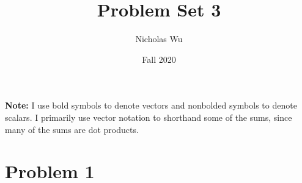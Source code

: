 \documentclass[10pt,letter]{article}
\newcommand{\problem}[1]{\section*{Problem #1}}
\begin{document}


\title{Problem Set 3}

\author{Nicholas Wu}

\date{Fall 2020}

\maketitle
\textbf{Note:} I use bold symbols to denote vectors and nonbolded symbols to denote scalars. I primarily use vector notation to shorthand some of the sums, since many of the sums are dot products.

\problem{1}
\end{document}
